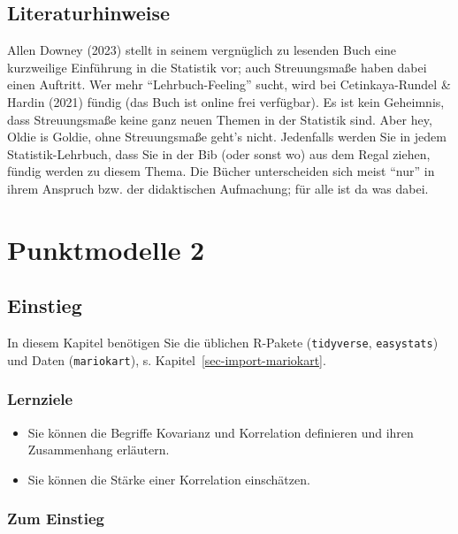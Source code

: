 \documentclass[
  letterpaper,
  twoside,
  open=any]{scrbook}
\providecommand{\tightlist}{%
  \setlength{\itemsep}{0pt}\setlength{\parskip}{0pt}}\usepackage{longtable,booktabs,array}
\theoremstyle{definition}
\theoremstyle{definition}
\theoremstyle{definition}
\theoremstyle{remark}
\begin{document}
\section{Literaturhinweise}\label{literaturhinweise-5}

Allen Downey (2023) stellt in seinem vergnüglich zu lesenden Buch eine
kurzweilige Einführung in die Statistik vor; auch Streuungsmaße haben
dabei einen Auftritt. Wer mehr \enquote{Lehrbuch-Feeling} sucht, wird
bei Cetinkaya-Rundel \& Hardin (2021) fündig (das Buch ist online frei
verfügbar). Es ist kein Geheimnis, dass Streuungsmaße keine ganz neuen
Themen in der Statistik sind. Aber hey, Oldie is Goldie, ohne
Streuungsmaße geht's nicht. Jedenfalls werden Sie in jedem
Statistik-Lehrbuch, dass Sie in der Bib (oder sonst wo) aus dem Regal
ziehen, fündig werden zu diesem Thema. Die Bücher unterscheiden sich
meist \enquote{nur} in ihrem Anspruch bzw. der didaktischen Aufmachung;
für alle ist da was dabei.

\chapter{Punktmodelle 2}\label{sec-zusammenhaenge}

\section{Einstieg}\label{einstieg-7}

In diesem Kapitel benötigen Sie die üblichen R-Pakete
(\texttt{tidyverse}, \texttt{easystats}) und Daten (\texttt{mariokart}),
s. Kapitel~\ref{sec-import-mariokart}.

\subsection{Lernziele}\label{lernziele-7}

\begin{itemize}
\tightlist
\item
  Sie können die Begriffe Kovarianz und Korrelation definieren und ihren
  Zusammenhang erläutern.
\item
  Sie können die Stärke einer Korrelation einschätzen.
\end{itemize}

\subsection{Zum Einstieg}\label{zum-einstieg}
\end{document}
